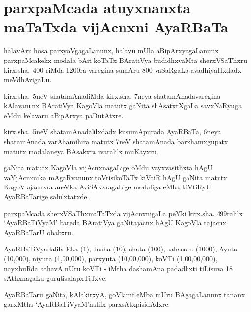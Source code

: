 \chapter{parxpaMcada atuyxnanxta maTaTxda vijAcnxni AyaRBaTa}%

halavAru hosa parxyoVgagaLanunx, halavu mUla aBipArxyagaLanunx parxpaMcakekx modala bAri koTaTx BAratiVya budidhxvaMta sherxVSaThxru kirx.sha.~{\rm 400} riMda {\rm 1200}ra varegina sumAru {\rm 800} vaSaRgaLa avadhiyalilxdadx meVdhAvigaLu.

kirx.sha.~{\rm 5}neV shatamAnadiMda kirx.sha. {\rm 7}neya shatamAnadavaregina kAlavanunx BAratiVya KagoVla matutx gaNita shAsatxrXgaLa savxNaRyuga eMdu kelavaru aBipArxya paDutAtxre.

kirx.sha.~{\rm 5}neV shatamAnadalilxdadx kusumApurada AyaRBaTa, {\rm 6}neya shatamAnada varAhamihira matutx {\rm 7}neV shatamAnada barxhamxgupatx matutx modalaneya BAsakxra ivaralilx muKayxru.

gaNita matutx KagoVla vijAcnxnagaLige oMdu vayxvasithxta hAgU vaYjAcnxnika mAgaRvanunx toVrisikoTaTx kiVtiR hAgU gaNita matutx KagoVlajacnxra aneVka AviSAkxragaLige modaliga eMba kiVtiRyU AyaRBaTarige salulxtatxde.

parxpaMcada sherxVSaThxmaTaTxda vijAcnxnigaLa peYki kirx.sha. {\rm 499}ralilx `AyaRBaTiVyaM' bareda BAratiVya gaNitajacnx hAgU KagoVla tajacnx AyaRBaTarU obabxru.

AyaRBaTiVyadalilx Eka ({\rm 1}), dasha ({\rm 10}), shata ({\rm 100}), sahasarx ({\rm 1000}), Ayuta ({\rm 10,000}), niyuta ({\rm 1,00,000}), parxyuta ({\rm 10,00,000}), koVTi ({\rm 1,00,00,000}), nayxbuRda athavA nUru koVTi - iMtha dashamAna padadhxti tiLisuva {\rm 18} sAthxnagaLu gurutisalapxTiTxve.

\newpage

AyaRBaTaru gaNita, kAlakirxyA, goVlamf eMba mUru BAgagaLanunx tananx garxMtha `AyaRBaTiVyaM'nalilx parxsAtxpisidAdxre.

